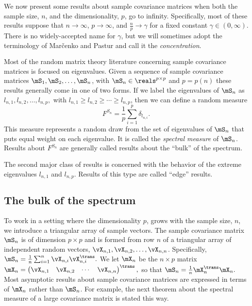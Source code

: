 We now present some results about sample covariance matrices when both the sample size, $n$, and the dimensionality, $p$, go to infinity.  Specifically, most of these results suppose that $n \to \infty$, $p \to \infty$, and 
\(
    \frac{n}{p} \to \gamma
\)
for a fixed constant
\(
    \gamma \in \left( 0, \infty \right).
\)
There is no widely-accepted name for $\gamma$, but we will sometimes adopt the terminology of Mar\v{c}enko and Pastur \cite{marcenko1967des} and call it the \emph{concentration}.

Most of the random matrix theory literature concerning sample covariance matrices is focused on eigenvalues.  Given a sequence of sample covariance matrices $\mS_1, \mS_2, \ldots, \mS_n$, with $\mS_n \in \reals^{p\times p}$ and $p = p(n)$ these results generally come in one of two forms.  If we label the eigenvalues of $\mS_n$ as
\(
    l_{n,1}, l_{n,2}, \ldots, l_{n,p},
\)
with $l_{n,1} \geq l_{n,2} \geq \cdots \geq l_{n,p}$, then we can define
a random measure
\begin{equation}
    F^{S_n} = \frac{1}{p} \sum_{i=1}^p \delta_{l_{n,i}}.
\end{equation}
This measure represents a random draw from the set of eigenvalues of $\mS_n$ that puts equal weight on each eigenvalue.  It is called the \emph{spectral measure} of $\mS_n$.  Results about $F^{S_n}$ are generally called results about the ``bulk'' of the spectrum.  

The second major class of results is concerned with the behavior of the
extreme eigenvalues $l_{n,1}$ and $l_{n,p}$. Results of this type are called
``edge'' results.

\subsection{The bulk of the spectrum}

To work in a setting where the dimensionality $p$, grows with the sample size, $n$, we introduce a triangular array of sample vectors.  The sample covariance matrix $\mS_n$ is of dimension $p\times p$ and is formed from row $n$ of a triangular array of independent random vectors,  
$\vX_{n,1}, \vX_{n,2}, \ldots, \vX_{n,n}$.  Specifically,
\(
    \mS_n
    =
    \frac{1}{n}
    \sum_{i=1}^n \vX_{n,i} \vX_{n,i}^\trans.
\)
We let $\mX_n$ be the $n \times p$ matrix
\(
    \mX_n
    =
    \left(
    \begin{matrix}
        \vX_{n,1} &
        \vX_{n,2} &
        \cdots &
        \vX_{n,n}
    \end{matrix}
    \right)^\trans,
\)
so that 
\(
    \mS_n
    =
    \frac{1}{n}
    \mX_n^\trans \mX_n.
\)
Most asymptotic results about sample covariance matrices are expressed in terms of $\mX_n$ rather than $\mS_n$.  For example, the next theorem about the spectral measure of a large covariance matrix is stated this way.

